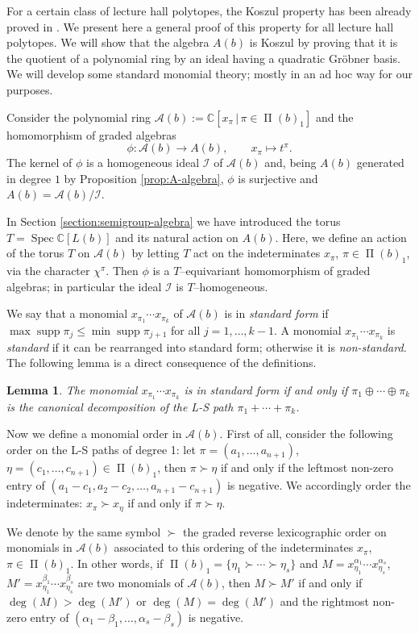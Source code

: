 \documentclass[12pt, a4paper]{amsart}   	%
\numberwithin{equation}{section}
\theoremstyle{plain}
\newtheorem{lemma}[theorem]{Lemma}
\theoremstyle{definition}
\newcommand{\mcA}{{\mathcal A}}
\newcommand{\mcI}{{\mathcal I}}
\DeclareMathOperator{\LS}{\Pi}
\DeclareMathOperator{\supp}{supp}
\DeclareMathOperator{\Spec}{Spec}
\newcommand{\CC}{\mathbb{C}}
\begin{document}
For a certain class of lecture hall polytopes, the Koszul property has been already proved in \cite{BrandenSolus}. We present here a general proof of this property for all lecture hall polytopes. We will show that the algebra $A(b)$ is Koszul by proving that it is the quotient of a polynomial ring by an ideal having a quadratic Gr\"obner basis. We will develop some standard monomial theory; mostly in an ad hoc way for our purposes.

Consider the polynomial ring $\mcA(b) := \CC[x_\pi\,|\,\pi\in\LS(b)_1]$ and the homomorphism of graded algebras
\[
\phi: \mcA(b) \longrightarrow A(b), \qquad x_\pi \longmapsto t^\pi.
\]
The kernel of $\phi$ is a homogeneous ideal $\mcI$ of $\mcA(b)$ and, being $A(b)$ generated in degree $1$ by Proposition \ref{prop:A-algebra}, $\phi$ is surjective and $A(b) = \mcA(b) / \mcI$.

In Section \ref{section:semigroup-algebra} we have introduced the torus $T=\Spec\CC[L(b)]$ and its natural action on $A(b)$. Here, we define an action of the torus $T$ on $\mcA(b)$ by letting $T$ act on the indeterminates $x_\pi$, $\pi\in\LS(b)_1$, via the character $\chi^\pi$. Then $\phi$ is a $T$--equivariant homomorphism of graded algebras; in particular the ideal $\mcI$ is $T$--homogeneous.

We say that a monomial $x_{\pi_1}\cdots x_{\pi_k}$ of $\mcA(b)$ is in \emph{standard form} if  $\max\supp\pi_j\leq \min\supp\pi_{j+1}$ for all $j=1,\ldots,k-1$. A monomial $x_{\pi_1}\cdots x_{\pi_k}$ is \emph{standard} if it can be rearranged into standard form; otherwise it is \emph{non-standard}. The following lemma is a direct consequence of the definitions.
\begin{lemma}\label{lem:standard-form-canonical-decomposition}
    The monomial $x_{\pi_1}\cdots x_{\pi_k}$ is in standard form if and only if $\pi_1 \oplus \cdots \oplus \pi_k$ is the canonical decomposition of the L-S path $\pi_1 + \cdots + \pi_k$.
\end{lemma}

Now we define a monomial order in $\mcA(b)$. First of all, consider the following order on the L-S paths of degree 1: let $\pi = (a_1,\ldots,a_{n+1})$, $\eta = (c_1, \ldots, c_{n+1})\in\LS(b)_1$, then $\pi \succ \eta$ if and only if the leftmost non-zero entry of $(a_1 - c_1, a_2 - c_2, \ldots, a_{n+1} - c_{n+1})$ is negative. We accordingly order the indeterminates: $x_\pi \succ x_\eta$ if and only if $\pi \succ\eta$.

We denote by the same symbol $\succ$ the graded reverse lexicographic order on monomials in $\mcA(b)$ associated to this ordering of the indeterminates $x_\pi$, $\pi\in\LS(b)_1$. In other words, if $\LS(b)_1 = \{\eta_1 \succ \cdots \succ \eta_s\}$ and $M = x_{\eta_1}^{\alpha_1}\cdots x_{\eta_s}^{\alpha_s}$, $M' = x_{\eta_1}^{\beta_1}\cdots x_{\eta_s}^{\beta_s}$ are two monomials of $\mcA(b)$, then $M \succ M'$ if and only if $\deg(M) > \deg(M')$ or $\deg(M) = \deg(M')$ and the rightmost non-zero entry of $(\alpha_1 - \beta_1, \ldots, \alpha_s - \beta_s)$ is negative.
\end{document}

